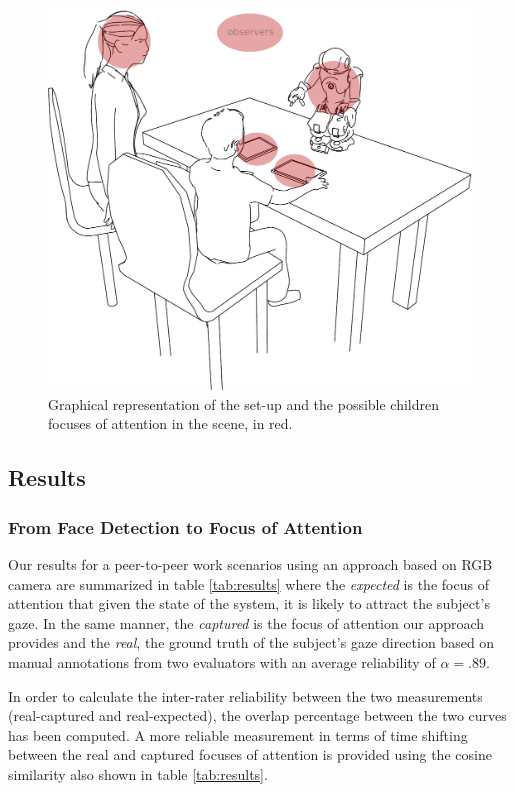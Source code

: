 \documentclass{sig-alternate}
\begin{document}
\begin{figure}[h!]
    \centering
    \includegraphics[width=0.7\columnwidth]{drawSetup}
    \caption{\small Graphical representation of the set-up and the possible children focuses of attention in the scene, in red.}
    \label{drawSetup}
\end{figure}


\subsection{Results}

\subsubsection{From Face Detection to Focus of Attention} \label{fromFaceTo}


Our results for a peer-to-peer work scenarios using an approach based on RGB
camera are summarized in table \ref{tab:results} where the \textit{expected} is
the focus of attention that given the state of the system, it is likely to
attract the subject's gaze. In the same manner, the \textit{captured} is the
focus of attention our approach provides and the \textit{real}, the ground truth
of the subject's gaze direction based on manual annotations from two evaluators
with an average reliability of $ \alpha = .89 $.

In order to calculate the inter-rater reliability between the two measurements
(real-captured and real-expected), the overlap percentage between the two curves
has been computed. A more reliable measurement in terms of time shifting between
the real and captured focuses of attention is provided using the cosine
similarity also shown in table \ref{tab:results}. 
\end{document}
